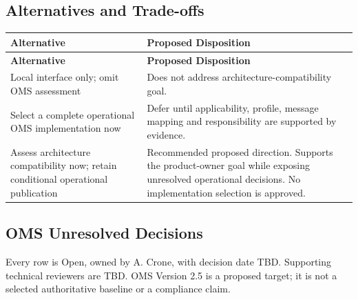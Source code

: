 \subsection{Alternatives and Trade-offs}

\begin{tabularx}{\linewidth}{L{4.3cm}Y}
\caption{OMS Direction Alternatives\label{Table:OMSDirectionAlternatives}}\\
\toprule\textbf{Alternative} & \textbf{Proposed Disposition}\\\midrule\endfirsthead
\toprule\textbf{Alternative} & \textbf{Proposed Disposition}\\\midrule\endhead\bottomrule\endlastfoot
Local interface only; omit OMS assessment & Does not address  architecture-compatibility goal.\\
Select a complete operational OMS implementation now & Defer until applicability, profile, message mapping and responsibility are supported by evidence.\\
Assess architecture compatibility now; retain conditional operational publication & Recommended proposed direction. Supports the product-owner goal while exposing unresolved operational decisions. No implementation selection is approved.\\
\end{tabularx}
\subsection{OMS Unresolved Decisions}
\label{Section:OMSUnresolvedDecisions}
Every row is Open, owned by A. Crone, with decision date TBD. Supporting
technical reviewers are TBD. OMS Version 2.5 is a proposed target; it is not
a selected authoritative baseline or a compliance claim.

